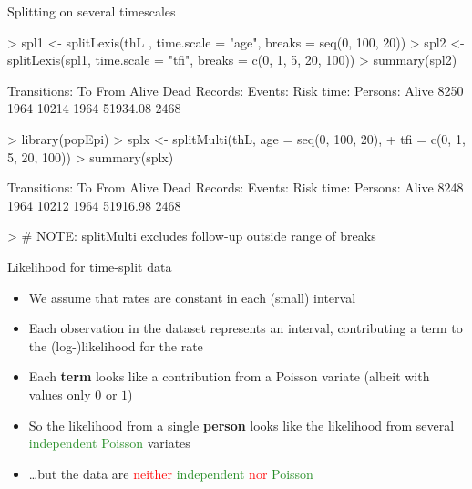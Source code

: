 \begin{frame}[fragile]{Splitting on several timescales}
\vspace*{-1em}
\begin{Schunk}
\begin{Sinput}
> spl1 <- splitLexis(thL , time.scale = "age", breaks = seq(0, 100, 20))
> spl2 <- splitLexis(spl1, time.scale = "tfi", breaks = c(0, 1, 5, 20, 100))
> summary(spl2)
\end{Sinput}
\begin{Soutput}
Transitions:
     To
From    Alive Dead Records: Events: Risk time: Persons:
  Alive  8250 1964    10214    1964   51934.08     2468
\end{Soutput}
\begin{Sinput}
> library(popEpi)
> splx <- splitMulti(thL, age = seq(0, 100, 20),
+                         tfi = c(0, 1, 5, 20, 100))
> summary(splx)
\end{Sinput}
\begin{Soutput}
Transitions:
     To
From    Alive Dead Records: Events: Risk time: Persons:
  Alive  8248 1964    10212    1964   51916.98     2468
\end{Soutput}
\begin{Sinput}
> # NOTE: splitMulti excludes follow-up outside range of breaks
\end{Sinput}
\end{Schunk}
\end{frame}

\begin{frame}[fragile]{Likelihood for time-split data}
  \begin{itemize}[<+->]
  \item We assume that rates are constant in each (small) interval
  \item Each observation in the dataset represents an interval,
    contributing a term to the (log-)likelihood for the rate
  \item Each \textbf{term} \alert<4->{looks like} a contribution from a Poisson variate
    (albeit with values only $0$ or $1$)
  \item So the likelihood from a single \textbf{person}
    \alert<4->{looks like} the likelihood from several
    \textcolor{forestgreen}{independent Poisson} variates
  \item \ldots but the data are \textcolor{red}{neither}
    \textcolor{forestgreen}{independent} \textcolor{red}{nor}
    \textcolor{forestgreen}{Poisson}
  \end{itemize}
\end{frame}

